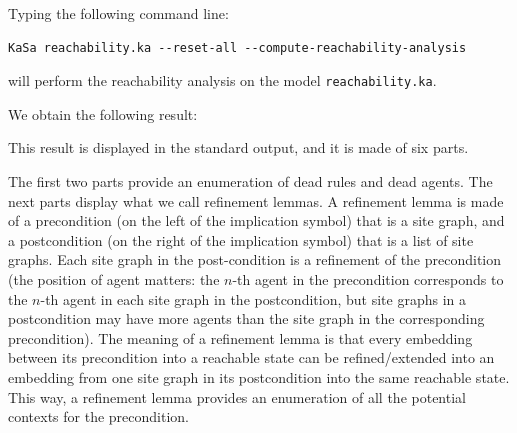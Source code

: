\documentclass[11pt]{book}
\begin{document}
Typing the following command line:
\begin{verbatim}
KaSa reachability.ka --reset-all --compute-reachability-analysis
\end{verbatim}

will perform the reachability analysis on the model \texttt{reachability.ka}.

We obtain the following result:




This result is displayed in the standard output, and it is made of six parts.

The first two parts provide an enumeration of dead rules and dead agents.
The next parts display what we call refinement lemmas.
A refinement lemma is made of a precondition (on the left of the implication symbol) that is a site graph, and a postcondition (on the right of the implication symbol) that is a list of site graphs. Each site graph in the post-condition is a refinement of the precondition (the position of agent matters: the $n$-th agent in the precondition corresponds to the $n$-th agent in each site graph in the postcondition, but site graphs in a postcondition may have more agents than the site graph in the corresponding precondition).
The meaning of a refinement lemma is that every embedding between its precondition into a reachable state can be refined/extended into
an embedding from one site graph in its postcondition into the same reachable state. This way, a refinement lemma provides an enumeration of all the potential contexts for the precondition.
\end{document}
